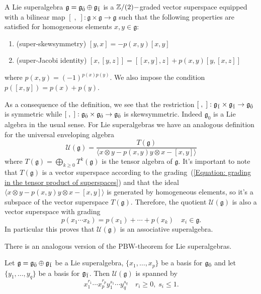 \begin{dang}
    \begin{definition}\cite{kac2013bombay}
        A Lie superalgebra $\mathfrak{g}=\mathfrak{g}_{\Bar{0}}\oplus\mathfrak{g}_{\Bar{1}}$ is a $\mathbb{Z}/(2)-$graded vector superspace equipped with a bilinear map $[\;,\;]: \mathfrak{g}\times \mathfrak{g}\rightarrow \mathfrak{g}$ such that the following properties are satisfied for homogeneous elements $x,y\in \mathfrak{g}$:
        \begin{enumerate}
            \item (super-skewsymmetry) $[y,x]=-p(x,y)[x,y]$ 
            \item (super-Jacobi identity) $[x,[y,z]]=[[x,y],z]+p(x,y)[y,[x,z]]$ 
        \end{enumerate}
        where $p(x,y)=(-1)^{p(x)p(y)}$. We also impose the condition $p([x,y])=p(x)+p(y)$.
    \end{definition}
\end{dang}
As a consequence of the definition, we see that the restriction $[\;,\;]: \mathfrak{g}_{\Bar{1}}\times \mathfrak{g}_{\Bar{1}}\rightarrow \mathfrak{g}_{\Bar{0}}$ is symmetric while $[\;,\;]: \mathfrak{g}_{\Bar{0}}\times \mathfrak{g}_{\Bar{0}}\rightarrow \mathfrak{g}_{\Bar{0}}$ is skewsymmetric. Indeed $\mathfrak{g}_0$ is a Lie algebra in the usual sense. For Lie superalgebras we have an analogous definition for the universal enveloping algebra
\begin{equation}
    \mathcal{U}(\mathfrak{g})=\frac{T(\mathfrak{g})}{\langle x\otimes y-p(x,y)y\otimes x-[x,y]\rangle}
\end{equation}
where $T(\mathfrak{g})=\bigoplus_{k\geq0}T^k(\mathfrak{g})$ is the tensor algebra of $\mathfrak{g}$. It's important to note that $T(\mathfrak{g})$ is a vector superspace according to the grading~(\ref{Equation: grading in the tensor product of superspaces}) and that the ideal $\langle  x\otimes y-p(x,y)y\otimes x-[x,y]\rangle$ is generated by homogeneous elements, so it's a subspace of the vector superspace $T(\mathfrak{g})$. Therefore, the quotient $\mathcal{U}(\mathfrak{g})$ is also a vector superspace with grading 
\begin{equation}
    p(x_1\cdots x_k)=p(x_1)+\cdots+p(x_k)\quad x_i\in\mathfrak{g}.
\end{equation}
In particular this proves that $\mathcal{U}(\mathfrak{g})$ is an associative superalgebra.\par
There is an analogous version of the PBW-theorem for Lie superalgebras.
\begin{dang}
    \begin{theorem}\label{Theorem: PBW theorem for Lie superalgebras}\cite{kac2013bombay}
        Let $\mathfrak{g}=\mathfrak{g}_{\Bar{0}}\oplus\mathfrak{g}_{\Bar{1}}$ be a Lie superalgebra, $\{x_1,\dots,x_p\}$ be a basis for $\mathfrak{g}_{\Bar{0}}$ and let $\{y_1,\dots,y_q\}$ be a basis for $\mathfrak{g}_{\Bar{1}}$. Then $\mathcal{U}(\mathfrak{g})$ is spanned by 
        \begin{equation}
        x_1^{r_1}\cdots x_p^{r_p} y_1^{s_1}\cdots y_q^{s_q}\quad r_i\geq0,\;s_i\leq 1 .     
        \end{equation}
    \end{theorem}
\end{dang}

